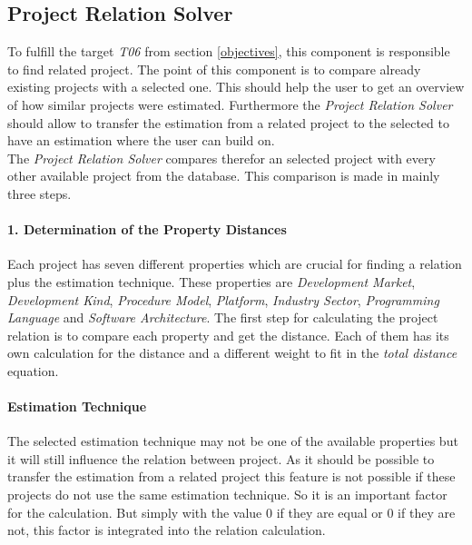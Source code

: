 \subsection{Project Relation Solver}\label{projectRealtionSolver}

To fulfill the target \textit{T06} from section \ref{objectives}, this component is responsible to find related project. The point of this component is to compare already existing projects with a selected one. This should help the user to get an overview of how similar projects were estimated. Furthermore the \textit{Project Relation Solver} should allow to transfer the estimation from a related project to the selected to have an estimation where the user can build on.\\
The \textit{Project Relation Solver} compares therefor an selected project with every other available project from the database. This comparison is made in mainly three steps.
\paragraph*{\textbf{1. Determination of the Property Distances}}
Each project has seven different properties which are crucial for finding a relation plus the estimation technique. These properties are \textit{Development Market}, \textit{Development Kind}, \textit{Procedure Model}, \textit{Platform}, \textit{Industry Sector}, \textit{Programming Language} and \textit{Software Architecture}. The first step for calculating the project relation is to compare each property and get the distance. Each of them has its own calculation for the distance and a different weight to fit in the \textit{total distance} equation. 

\paragraph*{\textbf{Estimation Technique}}

The selected estimation technique may not be one of the available properties but it will still influence the relation between project. As it should be possible to transfer the estimation from a related project this feature is not possible if these projects do not use the same estimation technique. So it is an important factor for the calculation. But simply with the value 0 if they are equal or 0 if they are not, this factor is integrated into the relation calculation.

